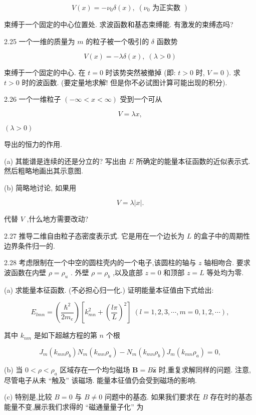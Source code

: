 \documentclass[lang=cn,newtx,10pt,scheme=chinese,thmcnt=section]{elegantbook}
\begin{document}
$$
V\left( x\right) = - {\nu }_{0}\delta \left( x\right) ,\;\left( {{\nu }_{0}\text{ 为正实数 }}\right)
$$

束缚于一个固定的中心位置处. 求波函数和基态束缚能. 有激发的束缚态吗?

2.25 一个一维的质量为 $m$ 的粒子被一个吸引的 $\delta$ 函数势

$$
V\left( x\right) = - {\lambda \delta }\left( x\right) ,\;\left( {\lambda > 0}\right)
$$

束缚于一个固定的中心. 在 $t = 0$ 时该势突然被撤掉 (即: $t > 0$ 时, $V = 0$ ). 求 $t > 0$ 时的波函数. (要定量地求解! 但是你不必试图计算可能出现的积分).

2.26 一个一维粒子 $\left( {-\infty < x < \infty }\right)$ 受到一个可从

$$
V = {\lambda x},
$$

$\left( {\lambda > 0}\right)$

导出的恒力的作用.

(a) 其能谱是连续的还是分立的? 写出由 $E$ 所确定的能量本征函数的近似表示式. 然后粗略地画出其示意图.

(b) 简略地讨论, 如果用

$$
V = \lambda \left| x\right| \text{.}
$$

代替 $V$ ,什么地方需要改动?

2.27 推导二维自由粒子态密度表示式. 它是用在一个边长为 $L$ 的盒子中的周期性边界条件归一的.

2.28 考虑限制在一个中空的圆柱壳内的一个电子,该圆柱的轴与 $z$ 轴相吻合. 要求波函数在内壁 $\rho = {\rho }_{u}$ . 外壁 $\rho = {\rho }_{b}$ ,以及底部 $z = 0$ 和顶部 $z = L$ 等处均为零.

(a) 求能量本征函数. (不必担心归一化.) 证明能量本征值由下式给出:

$$
{E}_{lmn} = \left( \frac{{\hbar }^{2}}{2{m}_{e}}\right) \left\lbrack {{k}_{mn}^{2} + {\left( \frac{l\pi }{L}\right) }^{2}}\right\rbrack \;\left( {l = 1,2,3,\cdots, m = 0,1,2,\cdots }\right) ,
$$

其中 ${k}_{nm}$ 是如下超越方程的第 $n$ 个根

$$
{J}_{m}\left( {{k}_{mn}{\rho }_{b}}\right) {N}_{m}\left( {{k}_{mn}{\rho }_{a}}\right) - {N}_{m}\left( {{k}_{mn}{\rho }_{b}}\right) {J}_{m}\left( {{k}_{mn}{\rho }_{a}}\right) = 0,
$$

(b) 当 $0 < \rho < {\rho }_{a}$ 区域存在一个均匀磁场 $\mathbf{B} = B\widehat{\mathbf{z}}$ 时,重复求解同样的问题. 注意,尽管电子从未 “触及” 该磁场. 能量本征值仍会受到磁场的影响.

(c) 特别是,比较 $B = 0$ 与 $B \neq 0$ 问题中的基态. 如果我们要求在 $B$ 存在时的基态能量不变,展示我们求得的 “磁通量量子化” 为
\end{document}
